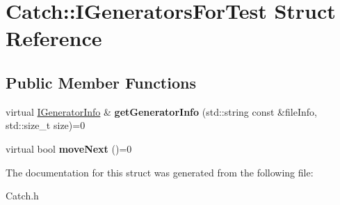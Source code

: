 \hypertarget{struct_catch_1_1_i_generators_for_test}{\section{Catch\-:\-:I\-Generators\-For\-Test Struct Reference}
\label{struct_catch_1_1_i_generators_for_test}
}
\subsection*{Public Member Functions}
\begin{DoxyCompactItemize}
\item 
\hypertarget{struct_catch_1_1_i_generators_for_test_a180d84e858840188e4c3788e47eefdb0}{virtual \hyperlink{struct_catch_1_1_i_generator_info}{I\-Generator\-Info} \& {\bfseries get\-Generator\-Info} (std\-::string const \&file\-Info, std\-::size\-\_\-t size)=0}\label{struct_catch_1_1_i_generators_for_test_a180d84e858840188e4c3788e47eefdb0}

\item 
\hypertarget{struct_catch_1_1_i_generators_for_test_adab31832d529fc584fd63164e0a1c8ad}{virtual bool {\bfseries move\-Next} ()=0}\label{struct_catch_1_1_i_generators_for_test_adab31832d529fc584fd63164e0a1c8ad}

\end{DoxyCompactItemize}


The documentation for this struct was generated from the following file\-:\begin{DoxyCompactItemize}
\item 
Catch.\-h\end{DoxyCompactItemize}
